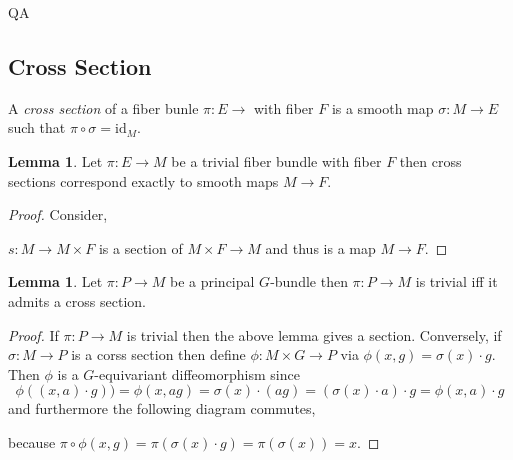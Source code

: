 QA	 \documentclass[12pt]{extarticle}
\newcommand{\id}{\mathrm{id}}
\theoremstyle{definition}
\newtheorem{lemma}[theorem]{Lemma}
\newenvironment{definition}[1][Definition:]{\begin{trivlist}
\item[\hskip \labelsep {\bfseries #1}]}{\end{trivlist}}
\begin{document}
\subsection{Cross Section}

\begin{definition}
A \textit{cross section} of a fiber bunle $\pi : E \to $ with fiber $F$ is a smooth map $\sigma : M \to E$ such that $\pi \circ \sigma = \id_M$.
\end{definition}


\begin{lemma}
Let $\pi : E \to M$ be a trivial fiber bundle with fiber $F$ then cross sections correspond exactly to smooth maps $M \to F$.
\end{lemma}

\begin{proof}
Consider,
\begin{center}
\end{center}
$s : M \to M \times F$ is a section of $M \times F \to M$ and thus is a map $M \to F$.
\end{proof}

\begin{lemma}
Let $\pi : P \to M$ be a principal $G$-bundle then $\pi : P \to M$ is trivial iff it admits a cross section.
\end{lemma}

\begin{proof}
If $\pi : P \to M$ is trivial then the above lemma gives a section. Conversely, if $\sigma : M \to P$ is a corss section then define $\phi : M \times G \to P$ via $\phi(x,g) = \sigma(x) \cdot g$. Then $\phi$ is a $G$-equivariant diffeomorphism since 
\[ \phi((x, a) \cdot g)) = \phi(x,ag) = \sigma(x) \cdot (ag) = (\sigma(x) \cdot a) \cdot g = \phi(x,a) \cdot g \]
and furthermore the following diagram commutes,
\begin{center}
\end{center}
because $\pi \circ \phi(x,g) = \pi(\sigma(x) \cdot g) = \pi(\sigma(x)) = x$. 
\end{proof}
\end{document}
